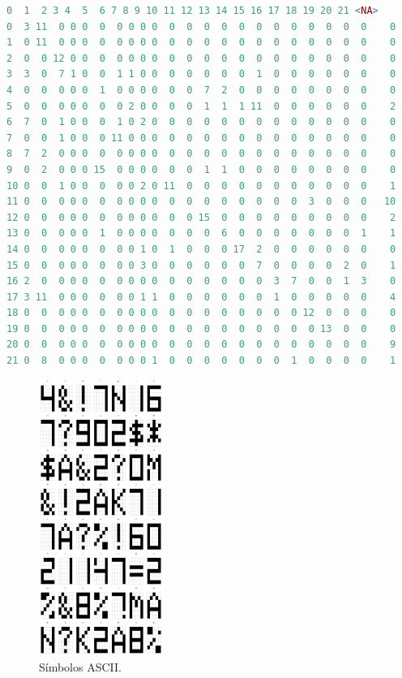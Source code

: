 \documentclass{article}
\begin{document}
\lstset{style=mystyle}
\begin{lstlisting}[language=R, caption= Matriz de confusión.]
   0  1  2 3 4  5  6 7 8 9 10 11 12 13 14 15 16 17 18 19 20 21 <NA>
0  3 11  0 0 0  0  0 0 0 0  0  0  0  0  0  0  0  0  0  0  0  0    0
1  0 11  0 0 0  0  0 0 0 0  0  0  0  0  0  0  0  0  0  0  0  0    0
2  0  0 12 0 0  0  0 0 0 0  0  0  0  0  0  0  0  0  0  0  0  0    0
3  3  0  7 1 0  0  1 1 0 0  0  0  0  0  0  1  0  0  0  0  0  0    0
4  0  0  0 0 0  1  0 0 0 0  0  0  7  2  0  0  0  0  0  0  0  0    0
5  0  0  0 0 0  0  0 2 0 0  0  0  1  1  1 11  0  0  0  0  0  0    2
6  7  0  1 0 0  0  1 0 2 0  0  0  0  0  0  0  0  0  0  0  0  0    0
7  0  0  1 0 0  0 11 0 0 0  0  0  0  0  0  0  0  0  0  0  0  0    0
8  7  2  0 0 0  0  0 0 0 0  0  0  0  0  0  0  0  0  0  0  0  0    0
9  0  2  0 0 0 15  0 0 0 0  0  0  1  1  0  0  0  0  0  0  0  0    0
10 0  0  1 0 0  0  0 0 2 0 11  0  0  0  0  0  0  0  0  0  0  0    1
11 0  0  0 0 0  0  0 0 0 0  0  0  0  0  0  0  0  0  3  0  0  0   10
12 0  0  0 0 0  0  0 0 0 0  0  0 15  0  0  0  0  0  0  0  0  0    2
13 0  0  0 0 0  1  0 0 0 0  0  0  0  6  0  0  0  0  0  0  0  1    1
14 0  0  0 0 0  0  0 0 1 0  1  0  0  0 17  2  0  0  0  0  0  0    0
15 0  0  0 0 0  0  0 0 3 0  0  0  0  0  0  7  0  0  0  0  2  0    1
16 2  0  0 0 0  0  0 0 0 0  0  0  0  0  0  0  3  7  0  0  1  3    0
17 3 11  0 0 0  0  0 0 1 1  0  0  0  0  0  0  1  0  0  0  0  0    4
18 0  0  0 0 0  0  0 0 0 0  0  0  0  0  0  0  0  0 12  0  0  0    0
19 0  0  0 0 0  0  0 0 0 0  0  0  0  0  0  0  0  0  0 13  0  0    0
20 0  0  0 0 0  0  0 0 0 0  0  0  0  0  0  0  0  0  0  0  0  0    9
21 0  8  0 0 0  0  0 0 0 1  0  0  0  0  0  0  0  1  0  0  0  0    1
\end{lstlisting}

\begin{figure} [h!]%
    \centering
    \includegraphics[height=9cm]{Figura2.png} %
    \caption{Símbolos ASCII.}
    \label{f2}
\end{figure}
\end{document}
